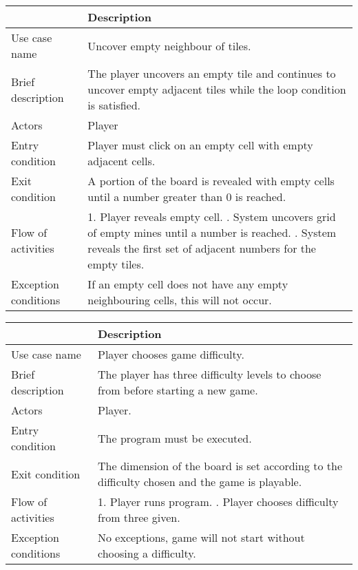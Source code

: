 \documentclass[12pt, a4]{report}
\begin{document}
	\begin{table}[ht]
	\begin{tabular}{|p{4cm}|p{12cm}|}
		\hline
		 & Description \\
		\hline
		Use case name & Uncover empty neighbour of tiles. \\
		Brief description & The player uncovers an empty tile and continues to uncover empty adjacent tiles while the loop condition is satisfied. \\
		Actors & Player \\
		Entry condition & Player must click on an empty cell with empty adjacent cells. \\
		Exit condition & A portion of the board is revealed with empty cells until a number greater than 0 is reached. \\
		Flow of activities & 1. Player reveals empty cell. \newline 2. System uncovers grid of empty mines until a number is reached. \newline 3. System reveals the first set of adjacent numbers for the empty tiles.\\
		Exception conditions & If an empty cell does not have any empty neighbouring cells, this will not occur.\\
		\hline
	\end{tabular}
	\end{table}

	\pagebreak

	\begin{table}[ht]
	\begin{tabular}{|p{4cm}|p{12cm}|}
		\hline
		 & Description \\
		\hline
		Use case name & Player chooses game difficulty. \\
		Brief description & The player has three difficulty levels to choose from before starting a new game. \\
		Actors & Player. \\
		Entry condition & The program must be executed. \\
		Exit condition & The dimension of the board is set according to the difficulty chosen and the game is playable. \\
		Flow of activities & 1. Player runs program. \newline 2. Player chooses difficulty from three given.\\
		Exception conditions & No exceptions, game will not start without choosing a difficulty.\\
		\hline
	\end{tabular}
	\end{table}
\end{document}
